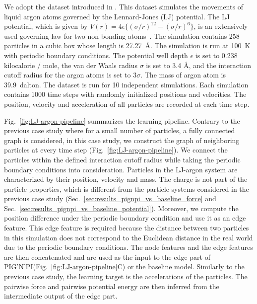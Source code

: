 \documentclass{article}
\newcommand{\pignpi}{PIG'N'PI\xspace}
\begin{document}
We adopt the dataset introduced in \cite{li2022graph}.  This dataset simulates the movements of liquid argon atoms governed by the Lennard-Jones (LJ) potential. The LJ potential, which is given by $V(r) = 4\epsilon \{(\sigma/r)^12 - (\sigma/r)^6\}$, is an extensively used governing law for two non-bonding atoms~\cite{rapaport2004art}. The simulation contains 258 particles in a cubic box whose length is 27.27~\r{A}. The simulation is run at 100~K with periodic boundary conditions. The potential well depth $\epsilon$ is set to 0.238 kilocalorie / mole, the van der Waals radius $\sigma$ is set to 3.4 \r{A}, and the interaction cutoff radius for the argon atoms is set to $3\sigma$. The mass of argon atom is 39.9~dalton. The dataset is run for 10 independent simulations. Each simulation contains 1000 time steps with randomly initialized positions and velocities. The position, velocity and acceleration of all particles are recorded at each time step. 

Fig.~\ref{fig:LJ-argon-pipeline} summarizes the learning pipeline. Contrary to the previous case study where for a small number of particles, a fully connected graph is considered, in this case study, we construct the graph of neighboring particles at every time step (Fig.~\ref{fig:LJ-argon-pipeline}). We connect the particles within the defined interaction cutoff radius while taking the periodic boundary conditions into consideration. Particles in the LJ-argon system are characterized by their position, velocity and mass. The charge is not part of the particle properties, which is different from the particle systems considered in the previous case study (Sec.~\ref{sec:results_pignpi_vs_baseline_force} and Sec.~\ref{sec:results_pignpi_vs_baseline_potential}). Moreover, we compute the position difference under the periodic boundary condition and use it as an edge feature. This edge feature is required because the distance between two particles in this simulation does not correspond to the Euclidean distance in the real world due to the periodic boundary conditions. The node features and the edge features are then concatenated and are used as the input to the edge part of \pignpi (Fig.~\ref{fig:LJ-argon-pipeline}C) or the baseline model. Similarly to the previous case study, the learning target is the accelerations of the particles. The pairwise force and pairwise potential energy are then inferred from the intermediate output of the edge part. 
\end{document}
